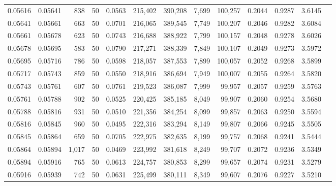 \begin{tabular}{rrrrrrrrrrrrr}
0.05616 & 0.05641 &   838 &  50 &                                     0.0563 & 215,402 & 390,208 &   7,699 & 100,257 & 0.2044 & 0.9287 & 3.6145 \\
0.05641 & 0.05661 &   663 &  50 &                                     0.0701 & 216,065 & 389,545 &   7,749 & 100,207 & 0.2046 & 0.9282 & 3.6084 \\
0.05661 & 0.05678 &   623 &  50 &                                     0.0743 & 216,688 & 388,922 &   7,799 & 100,157 & 0.2048 & 0.9278 & 3.6026 \\
0.05678 & 0.05695 &   583 &  50 &                                     0.0790 & 217,271 & 388,339 &   7,849 & 100,107 & 0.2049 & 0.9273 & 3.5972 \\
0.05695 & 0.05716 &   786 &  50 &                                     0.0598 & 218,057 & 387,553 &   7,899 & 100,057 & 0.2052 & 0.9268 & 3.5899 \\
0.05717 & 0.05743 &   859 &  50 &                                     0.0550 & 218,916 & 386,694 &   7,949 & 100,007 & 0.2055 & 0.9264 & 3.5820 \\
0.05743 & 0.05761 &   607 &  50 &                                     0.0761 & 219,523 & 386,087 &   7,999 &  99,957 & 0.2057 & 0.9259 & 3.5763 \\
0.05761 & 0.05788 &   902 &  50 &                                     0.0525 & 220,425 & 385,185 &   8,049 &  99,907 & 0.2060 & 0.9254 & 3.5680 \\
0.05788 & 0.05816 &   931 &  50 &                                     0.0510 & 221,356 & 384,254 &   8,099 &  99,857 & 0.2063 & 0.9250 & 3.5594 \\
0.05816 & 0.05845 &   960 &  50 &                                     0.0495 & 222,316 & 383,294 &   8,149 &  99,807 & 0.2066 & 0.9245 & 3.5505 \\
0.05845 & 0.05864 &   659 &  50 &                                     0.0705 & 222,975 & 382,635 &   8,199 &  99,757 & 0.2068 & 0.9241 & 3.5444 \\
0.05864 & 0.05894 & 1,017 &  50 &                                     0.0469 & 223,992 & 381,618 &   8,249 &  99,707 & 0.2072 & 0.9236 & 3.5349 \\
0.05894 & 0.05916 &   765 &  50 &                                     0.0613 & 224,757 & 380,853 &   8,299 &  99,657 & 0.2074 & 0.9231 & 3.5279 \\
0.05916 & 0.05939 &   742 &  50 &                                     0.0631 & 225,499 & 380,111 &   8,349 &  99,607 & 0.2076 & 0.9227 & 3.5210 \\

\end{tabular}
